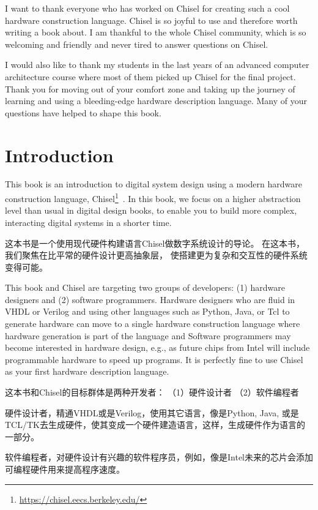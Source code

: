 \documentclass[%
    10pt,
    headinclude, footexclude,
    openright, %
    notitlepage,
    cleardoubleempty,
    headsepline,
    pointlessnumbers,
    bibtotoc, idxtotoc,
    ]{scrbook}
\newcommand{\myref}[2]{\href{#1}{#2}}
\renewcommand{\myref}[2]{{#2}{\footnote{\url{#1}}}}
\begin{document}
I want to thank everyone who has worked on Chisel for creating such
a cool hardware construction language. Chisel is so joyful to use and
therefore worth writing a book about.
I am thankful to the whole Chisel community, which is so welcoming and friendly
and never tired to answer questions on Chisel.

I would also like to thank my students in the last years of an advanced computer
architecture course where most of them picked up Chisel for the final project.
Thank you for moving out of your comfort zone and taking up the journey of
learning and using a bleeding-edge hardware description language.
Many of your questions have helped to shape this book.


\mainmatter

\chapter{Introduction}
\label{sec:intro}

This book is an introduction to digital system design using a modern hardware
construction language, \myref{https://chisel.eecs.berkeley.edu/}{Chisel}~\cite{chisel:dac2012}.
In this book, we focus on a higher abstraction level than usual in digital design books,
to enable you to build more complex, interacting digital systems in a shorter time.

这本书是一个使用现代硬件构建语言Chisel做数字系统设计的导论。
在这本书，我们聚焦在比平常的硬件设计更高抽象层，
使搭建更为复杂和交互性的硬件系统变得可能。

This book and Chisel are targeting two groups of developers:
(1) hardware designers and (2) software programmers.
Hardware designers who are fluid in VHDL or Verilog and using other languages such as Python,
Java, or Tcl to generate hardware can move to a single hardware construction language
where hardware generation is part of the language and
Software programmers may become interested in hardware design,
e.g., as future chips from Intel will include programmable hardware to speed up programs.
It is perfectly fine to use Chisel as your first hardware description language.

这本书和Chisel的目标群体是两种开发者：
（1）硬件设计者 （2）软件编程者

硬件设计者，精通VHDL或是Verilog，使用其它语言，像是Python, Java, 或是TCL/TK去生成硬件，使其变成一个硬件建造语言，这样，生成硬件作为语言的一部分。

软件编程者，对硬件设计有兴趣的软件程序员，例如，像是Intel未来的芯片会添加可编程硬件用来提高程序速度。
\end{document}
